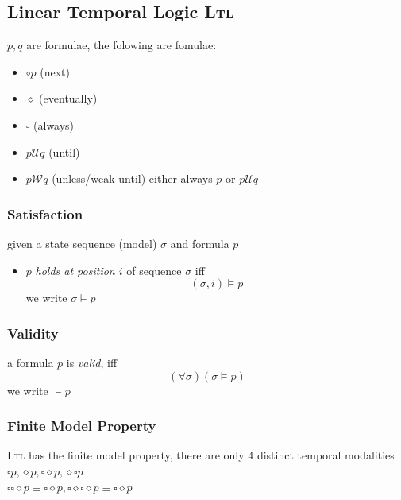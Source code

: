 \documentclass[a4paper, 10pt]{article}
\begin{document}
\subsection*{Linear Temporal Logic \textsc{Ltl}}
$p,q$ are formulae, the folowing are fomulae:
\begin{itemize}
    \item $\circ p$ (next)
    \item $\diamond$ (eventually)
    \item $\square$ (always)
    \item $p \mathcal{U}q$ (until)
    \item $p \mathcal{W}q$ (unless/weak until) {\tiny either always $p$ or $p \mathcal{U} q$}
\end{itemize}
\subsubsection*{Satisfaction}
given a state sequence (model) $\sigma$ and formula $p$
\begin{itemize}
    \item $p$ \emph{holds at position $i$} of sequence $\sigma$ iff \[ (\sigma,i) \models p \] we write $\sigma\models p$
\end{itemize}
\subsubsection*{Validity}
a formula $p$ is \emph{valid}, iff \[ (\forall\sigma)(\sigma\models p) \] we write $\models p$
\subsubsection*{Finite Model Property}
\textsc{Ltl} has the finite model property, there are only $4$ distinct temporal modalities \\
$\square p, \diamond p, \square\diamond p, \diamond\square p$ \\
$\square\square\diamond p\equiv\square\diamond p, \square\diamond\square\diamond p\equiv\square\diamond p$
\end{document}
